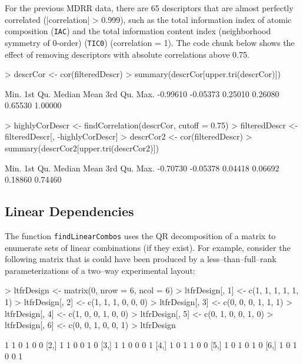 \documentclass[12pt]{article}
\begin{document}
For the previous MDRR data, there are 65 descriptors that are almost perfectly correlated (|correlation| > 0.999), such as the total information index of atomic composition (\texttt{IAC}) and the total information content index (neighborhood symmetry of 0-order) (\texttt{TIC0}) (correlation = 1). The code chunk below shows the effect of removing descriptors with absolute correlations above 0.75.

\begin{small}
\begin{Schunk}
\begin{Sinput}
> descrCor <- cor(filteredDescr)
> summary(descrCor[upper.tri(descrCor)])
\end{Sinput}
\begin{Soutput}
    Min.  1st Qu.   Median     Mean  3rd Qu.     Max. 
-0.99610 -0.05373  0.25010  0.26080  0.65530  1.00000 
\end{Soutput}
\begin{Sinput}
> highlyCorDescr <- findCorrelation(descrCor, cutoff = 0.75)
> filteredDescr <- filteredDescr[, -highlyCorDescr]
> descrCor2 <- cor(filteredDescr)
> summary(descrCor2[upper.tri(descrCor2)])
\end{Sinput}
\begin{Soutput}
    Min.  1st Qu.   Median     Mean  3rd Qu.     Max. 
-0.70730 -0.05378  0.04418  0.06692  0.18860  0.74460 
\end{Soutput}
\end{Schunk}
\end{small}

\subsection{Linear Dependencies}

The function \texttt{findLinearCombos} uses the QR decomposition of a matrix to enumerate sets of linear combinations (if they exist). For example, consider the following matrix that is could have been produced by a less--than--full--rank parameterizations of a two--way experimental layout:

\begin{small}
\begin{Schunk}
\begin{Sinput}
> ltfrDesign <- matrix(0, nrow = 6, ncol = 6)
> ltfrDesign[, 1] <- c(1, 1, 1, 1, 1, 1)
> ltfrDesign[, 2] <- c(1, 1, 1, 0, 0, 0)
> ltfrDesign[, 3] <- c(0, 0, 0, 1, 1, 1)
> ltfrDesign[, 4] <- c(1, 0, 0, 1, 0, 0)
> ltfrDesign[, 5] <- c(0, 1, 0, 0, 1, 0)
> ltfrDesign[, 6] <- c(0, 0, 1, 0, 0, 1)
> ltfrDesign
\end{Sinput}
\begin{Soutput}
     [,1] [,2] [,3] [,4] [,5] [,6]
[1,]    1    1    0    1    0    0
[2,]    1    1    0    0    1    0
[3,]    1    1    0    0    0    1
[4,]    1    0    1    1    0    0
[5,]    1    0    1    0    1    0
[6,]    1    0    1    0    0    1
\end{Soutput}
\end{Schunk}
\end{small}
\end{document}
